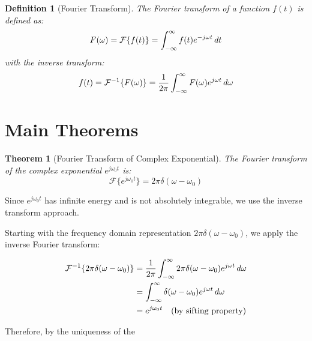 \documentclass{article}
\newtheorem{definition}{Definition}
\newtheorem{theorem}{Theorem}
\begin{document}
\begin{definition}
  [Fourier Transform] The Fourier transform of a function $f (t)$ is defined
  as:
  \[ F (\omega) =\mathcal{F} \{f (t)\} = \int_{- \infty}^{\infty} f (t) e^{- j
     \omega t}  \hspace{0.17em} dt \]
  with the inverse transform:
  \[ f (t) =\mathcal{F}^{- 1} \{F (\omega)\} = \frac{1}{2 \pi}  \int_{-
     \infty}^{\infty} F (\omega) e^{j \omega t}  \hspace{0.17em} d \omega \]
\end{definition}

\section{Main Theorems}

\begin{theorem}
  [Fourier Transform of Complex Exponential] The Fourier transform of the
  complex exponential $e^{j \omega_0 t}$ is:
  \[ \mathcal{F} \{e^{j \omega_0 t} \} = 2 \pi \delta (\omega - \omega_0) \]
\end{theorem}

Since $e^{j \omega_0 t}$ has infinite energy and is not absolutely integrable,
we use the inverse transform approach.

Starting with the frequency domain representation $2 \pi \delta (\omega -
\omega_0)$, we apply the inverse Fourier transform:

\begin{align}
  \mathcal{F}^{- 1}  \{2 \pi \delta (\omega - \omega_0)\} & = \frac{1}{2 \pi} 
  \int_{- \infty}^{\infty} 2 \pi \delta (\omega - \omega_0) e^{j \omega t} 
  \hspace{0.17em} d \omega \\
  & = \int_{- \infty}^{\infty} \delta (\omega - \omega_0) e^{j \omega t} 
  \hspace{0.17em} d \omega \\
  & = e^{j \omega_0 t} \quad \text{(by sifting property)} 
\end{align}

Therefore, by the uniqueness of the
\end{document}
